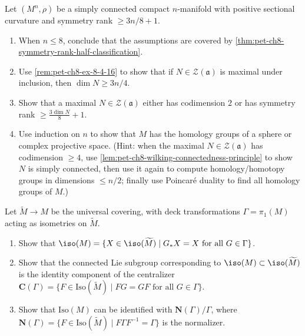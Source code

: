 \begin{remark}
  \label{rem:pet-ch8-ex-8-4-17}

  Let $(M^n,\rho)$ be a simply connected compact $n$-manifold with positive
  sectional curvature and symmetry rank $\ge3n/8+1$.
  \begin{enumerate}
    \item When $n\le8$, conclude that the assumptions are covered by
      \cref{thm:pet-ch8-symmetry-rank-half-classification}.
    \item Use \cref{rem:pet-ch8-ex-8-4-16} to show that if
      $N\in\mathcal Z(\mathfrak a)$ is maximal under inclusion, then
      $\dim N\ge3n/4$.
    \item Show that a maximal $N\in\mathcal Z(\mathfrak a)$ either has
      codimension $2$ or has symmetry rank $\ge\tfrac{3\dim N}8+1$.
    \item Use induction on $n$ to show that $M$ has the homology groups of a
      sphere or complex projective space. (Hint: when the maximal
      $N\in\mathcal Z(\mathfrak a)$ has codimension $\ge4$, use
      \cref{lem:pet-ch8-wilking-connectedness-principle} to show $N$ is simply
      connected, then use it again to compute homology/homotopy groups in
      dimensions $\le n/2$; finally use Poincar\'e duality to find all
      homology groups of $M$.)
  \end{enumerate}
\end{remark}

\begin{remark}
  \label{rem:pet-ch8-ex-8-4-18}

  Let $\widetilde M\to M$ be the universal covering, with deck transformations
  $\Gamma=\pi_1(M)$ acting as isometries on $\widetilde M$.
  \begin{enumerate}
    \item Show that
      $\iso(M)=\{X\in\iso(\widetilde M)\mid G_*X=X\text{ for all }G\in\Gamma\}$.
    \item Show that the connected Lie subgroup corresponding to
      $\iso(M)\subset\iso(\widetilde M)$ is the identity component of the
      centralizer
      $\mathbf C(\Gamma)=\{F\in\mathrm{Iso}(\widetilde M)\mid FG=GF\text{ for all }G\in\Gamma\}$.
    \item Show that $\mathrm{Iso}(M)$ can be identified with
      $\mathbf N(\Gamma)/\Gamma$, where
      $\mathbf N(\Gamma)=\{F\in\mathrm{Iso}(\widetilde M)\mid F\Gamma F^{-1}=\Gamma\}$
      is the normalizer.
  \end{enumerate}
\end{remark}
